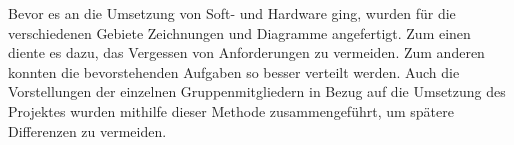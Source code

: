 \label{Entwurf}

Bevor es an die Umsetzung von Soft- und Hardware ging, wurden für die verschiedenen Gebiete Zeichnungen und Diagramme angefertigt. Zum einen diente es dazu, das Vergessen von Anforderungen zu vermeiden. Zum anderen konnten die bevorstehenden Aufgaben so besser verteilt werden. Auch die Vorstellungen der einzelnen Gruppenmitgliedern in Bezug auf die Umsetzung des Projektes wurden mithilfe dieser Methode zusammengeführt, um spätere Differenzen zu vermeiden.